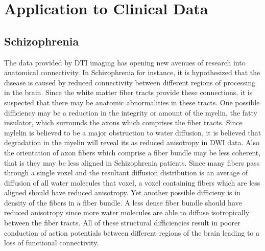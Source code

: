 \chapter{Application to Clinical Data}

\section{Schizophrenia}

The data provided by DTI imaging has opening new avenues of research into anatomical connectivity.  In Schizophrenia for instance, it is hypothesized that the disease is caused by reduced connectivity between different regions of processing in the brain.  Since the white matter fiber tracts provide these connections, it is suspected that there may be anatomic abnormalities in these tracts.  One possible difficiency may be a reduction in the integrity or amount of the myelin, the fatty insulator, which surrounds the axons which comprises the fiber tracts.  Since mylelin is believed to be a major obstruction to water diffusion, it is believed that degradation in the myelin will reveal its as reduced anisotropy in DWI data.  Also the orientation of axon fibers which comprise a fiber bundle may be less coherent, that is they may be less aligned in Schizophrenia patients.  Since many fibers pass through a single voxel and the resultant diffusion distribution is an average of diffusion of all water molecules that voxel, a voxel containing fibers which are less aligned should have reduced anisotropy.  Yet another possible difficieny is in density of the fibers in a fiber bundle.  A less dense fiber bundle should have reduced anisotropy since more water molecules are able to diffuse isotropically between the fiber tracts. All of these structural difficiencies result in poorer conduction of action potentials between different regions of the brain leading to a loss of functional connectivity.

